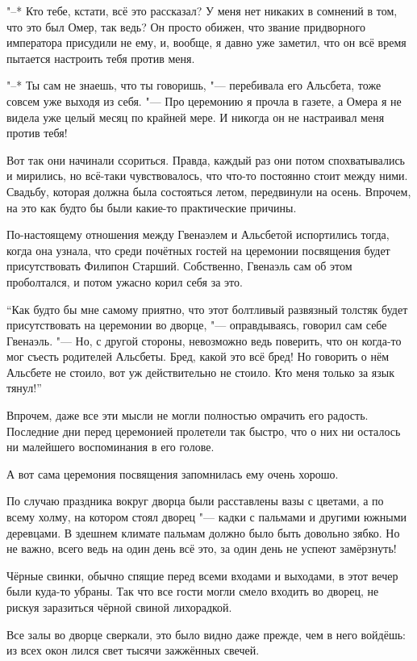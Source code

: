 "--* Кто тебе, кстати, всё это рассказал?
У меня нет никаких в сомнений в том, что это был Омер, так ведь?
Он просто обижен, что звание придворного императора присудили не ему, и, вообще,
я давно уже заметил, что он всё время пытается настроить тебя против меня.

"--* Ты сам не знаешь, что ты говоришь, "--- перебивала его Альсбета, тоже
совсем уже выходя из себя.
"--- Про церемонию я прочла в газете, а Омера я не видела уже целый месяц по
крайней мере.
И никогда он не настраивал меня против тебя!

Вот так они начинали ссориться.
Правда, каждый раз они потом спохватывались и мирились, но всё-таки
чувствовалось, что что-то постоянно стоит между ними.
Свадьбу, которая должна была состояться летом, передвинули на осень.
Впрочем, на это как будто бы были какие-то практические причины.

По-настоящему отношения между Гвенаэлем и Альсбетой испортились тогда, когда она
узнала, что среди почётных гостей на церемонии посвящения будет присутствовать
Филипон Старший.
Собственно, Гвенаэль сам об этом проболтался, и потом ужасно корил себя за это.

\enquote{Как будто бы мне самому приятно, что этот болтливый развязный толстяк
будет присутствовать на церемонии во дворце, "--- оправдываясь, говорил сам себе
Гвенаэль.
"--- Но, с другой стороны, невозможно ведь поверить, что он когда-то мог съесть
родителей Альсбеты.
Бред, какой это всё бред!
Но говорить о нём Альсбете не стоило, вот уж действительно не стоило.
Кто меня только за язык тянул!}

Впрочем, даже все эти мысли не могли полностью омрачить его радость.
Последние дни перед церемонией пролетели так быстро, что о них ни осталось ни
малейшего воспоминания в его голове.

А вот сама церемония посвящения запомнилась ему очень хорошо.

По случаю праздника вокруг дворца были расставлены вазы с цветами, а по всему
холму, на котором стоял дворец "--- кадки с пальмами и другими южными деревцами.
В здешнем климате пальмам должно было быть довольно зябко.
Но не важно, всего ведь на один день всё это, за один день не успеют замёрзнуть!

Чёрные свинки, обычно спящие перед всеми входами и выходами, в этот вечер были
куда-то убраны.
Так что все гости могли смело входить во дворец, не рискуя заразиться чёрной
свиной лихорадкой.

Все залы во дворце сверкали, это было видно даже прежде, чем в него войдёшь:
из всех окон лился свет тысячи зажжённых свечей.

